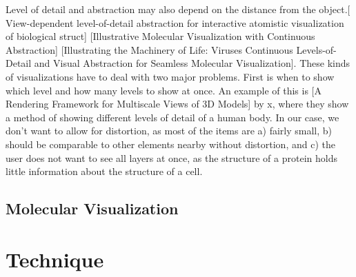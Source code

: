 \documentclass[review,journal]{vgtc}         %
\begin{document}
Level of detail and abstraction may also depend on the distance from the object.[ View-dependent level-of-detail abstraction for interactive atomistic visualization of biological struct] [Illustrative Molecular Visualization with Continuous Abstraction] [Illustrating the Machinery of Life: Viruses Continuous Levels-of-Detail and Visual Abstraction for Seamless Molecular Visualization]. 
These kinds of visualizations have to deal with two major problems. First is when to show which level and how many levels to show at once. An example of this is [A Rendering Framework for Multiscale Views of 3D Models] by x, where they show a method of showing different levels of detail of a human body. In our case, we don’t want to allow for distortion, as most of the items are a) fairly small, b) should be comparable to other elements nearby without distortion, and c) the user does not want to see all layers at once, as the structure of a protein holds little information about the structure of a cell.

\subsection{Molecular Visualization}

\section{Technique}
\end{document}
